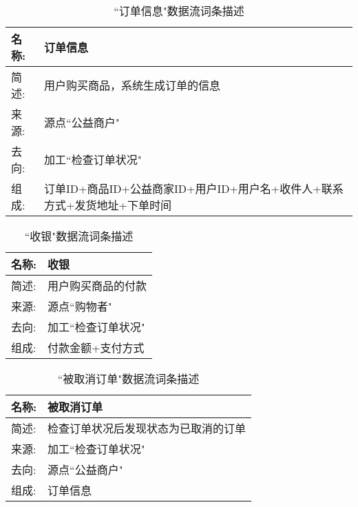 \begin{table}[H]  
    \caption{``订单信息"数据流词条描述}  
    \begin{center}  
        \begin{tabular}{l p{11cm}} 
            \hline
            \quad 名称:  &   订单信息 \\
            \hline
            \quad 简述:  & 用户购买商品，系统生成订单的信息 \\
            \hline
            \quad 来源:  & 源点``公益商户" \\
            \hline
            \quad 去向:  & 加工``检查订单状况" \\
            \hline
            \quad 组成:  & 订单ID+商品ID+公益商家ID+用户ID+用户名+收件人+联系方式+发货地址+下单时间 \\
            \hline
        \end{tabular}
        \label{tab1}
    \end{center}
    \end{table}
    
    
    \begin{table}[H]  
    \caption{``收银"数据流词条描述}  
    \begin{center}  
        \begin{tabular}{l p{11cm}} 
            \hline
            \quad 名称:  &   收银 \\
            \hline
            \quad 简述:  & 用户购买商品的付款 \\
            \hline
            \quad 来源:  & 源点``购物者" \\
            \hline
            \quad 去向:  & 加工``检查订单状况" \\
            \hline
            \quad 组成:  & 付款金额+支付方式  \\
            \hline
        \end{tabular}
        \label{tab1}
    \end{center}
    \end{table}
    
    \begin{table}[H]  
    \caption{``被取消订单"数据流词条描述}  
    \begin{center}  
        \begin{tabular}{l p{11cm}} 
            \hline
            \quad 名称:  &   被取消订单 \\
            \hline
            \quad 简述:  & 检查订单状况后发现状态为已取消的订单 \\
            \hline
            \quad 来源:  & 加工``检查订单状况" \\
            \hline
            \quad 去向:  & 源点``公益商户" \\
            \hline
            \quad 组成:  & 订单信息  \\
            \hline
        \end{tabular}
        \label{tab1}
    \end{center}
    \end{table}
    
